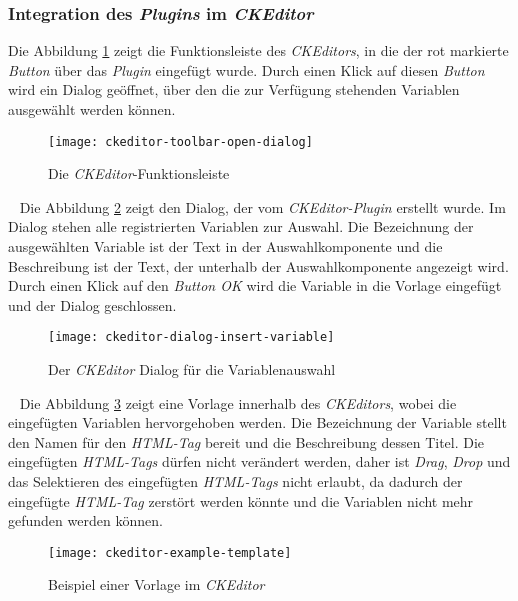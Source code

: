 \subsubsection{Integration des \emph{Plugins} im \emph{CKEditor}}
Die Abbildung \ref{fig:ckeditor-toolbar-opne-dialog} zeigt die Funktionsleiste des \emph{CKEditors}, in die der rot markierte \emph{Button} über das \emph{Plugin} eingefügt wurde. Durch einen Klick auf diesen \emph{Button} wird ein Dialog geöffnet, über den die zur Verfügung stehenden Variablen ausgewählt werden können.
\begin{figure}[h]
\centering
\texttt{[image: ckeditor-toolbar-open-dialog]}
\caption{Die \emph{CKEditor}-Funktionsleiste}
\label{fig:ckeditor-toolbar-opne-dialog}
\end{figure}
\ \newline
Die Abbildung \ref{fig:ckeditor-dialog-insert-variable} zeigt den Dialog, der vom \emph{CKEditor-Plugin} erstellt wurde. Im Dialog stehen alle registrierten Variablen zur Auswahl. Die Bezeichnung der ausgewählten Variable ist der Text in der Auswahlkomponente und die Beschreibung ist der Text, der unterhalb der Auswahlkomponente angezeigt wird. Durch einen Klick auf den \emph{Button OK} wird die Variable in die Vorlage eingefügt und der Dialog  geschlossen.
\begin{figure}[h]
\centering
\texttt{[image: ckeditor-dialog-insert-variable]}
\caption{Der \emph{CKEditor} Dialog für die Variablenauswahl}
\label{fig:ckeditor-dialog-insert-variable}
\end{figure}
\ \newline
Die Abbildung \ref{fig:ckeditor-example-template} zeigt eine Vorlage innerhalb des \emph{CKEditors}, wobei die eingefügten Variablen hervorgehoben werden. Die Bezeichnung  der Variable stellt den Namen für den \emph{HTML-Tag} bereit und die Beschreibung dessen Titel. Die eingefügten \emph{HTML-Tags} dürfen nicht verändert werden, daher ist \emph{Drag}, \emph{Drop} und das Selektieren des eingefügten \emph{HTML-Tags} nicht erlaubt, da dadurch der eingefügte \emph{HTML-Tag} zerstört werden könnte und die Variablen nicht mehr gefunden werden können.
\begin{figure}[h]
\centering
\texttt{[image: ckeditor-example-template]}
\caption{Beispiel einer Vorlage im \emph{CKEditor}}
\label{fig:ckeditor-example-template}
\end{figure}

